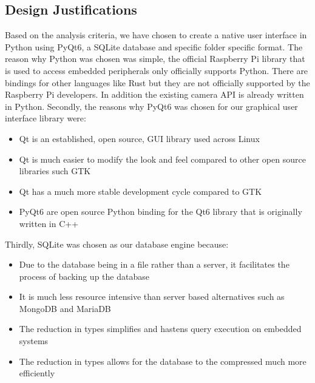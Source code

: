 \subsection{Design Justifications}
Based on the analysis criteria, we have chosen to create a native user interface in Python using PyQt6, a SQLite database and specific folder specific format.\cite{PyQt2023}\cite{SQLite2023} The reason why Python was chosen was simple, the official Raspberry Pi library that is used to access embedded peripherals only officially supports Python. There are bindings for other languages like Rust but they are not officially supported by the Raspberry Pi developers. In addition the existing camera API  is already written in Python. Secondly, the reasons why PyQt6 was chosen for our graphical user interface library were:
\begin{itemize}
	\item Qt is an established, open source, GUI library used across Linux
	\item Qt is much easier to modify the look and feel compared to other open source libraries such GTK
	\item Qt has a much more stable development cycle compared to GTK
	\item PyQt6 are open source Python binding for the Qt6 library that is originally written in C++
\end{itemize}
Thirdly, SQLite was chosen as our database engine because:
\begin{itemize}
	\item Due to the database being in a file rather than a server, it facilitates the process of backing up the database
	\item It is much less resource intensive than server based alternatives such as MongoDB and MariaDB
	\item The reduction in types simplifies and hastens query execution on embedded systems
	\item The reduction in types allows for the database to the compressed much more efficiently
\end{itemize}
